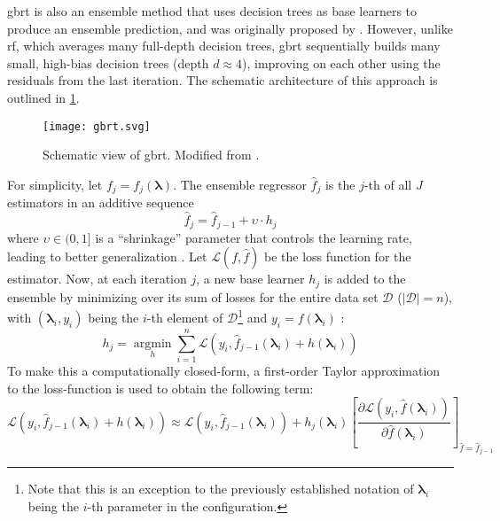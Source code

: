 \gls{gbrt} is also an ensemble method that uses decision trees as base learners to produce an ensemble prediction, and was originally proposed by \citet{friedman2001greedy}. However, unlike \gls{rf}, which averages many full-depth decision trees, \gls{gbrt} sequentially builds many small, high-bias decision trees (depth $d \approx 4$), improving on each other using the residuals from the last iteration. The schematic architecture of this approach is outlined in \cref{fig:gbrt}.
\begin{figure}
	\centering
	\texttt{[image: gbrt.svg]}
	\caption[Schematic view of \gls{gbrt}]{Schematic view of \gls{gbrt}. Modified from \citet{deng2021ensemble}.}
	\label{fig:gbrt}
\end{figure}
For simplicity, let $f_j = f_j(\mathbf{\lambda})$. The ensemble regressor $\hat{f}_j$ is the $j$-th of all $J$ estimators in an additive sequence 
\begin{equation}
	\label{eq:add-gbrt}
	\hat{f}_j = \hat{f}_{j-1} + \upsilon \cdot h_j
\end{equation}
where $\upsilon \in (0,1]$ is a \enquote{shrinkage} parameter that controls the learning rate, leading to better generalization \cite{friedman2002stochastic}.
Let $\mathcal{L}(f,\hat{f})$ be the loss function for the estimator. Now, at each iteration $j$, a new base learner $h_j$ is added to the ensemble by minimizing over its sum of losses for the entire data set $\mathcal{D}$ ($|\mathcal{D}| = n$), with $(\mathbf{\lambda}_i, y_i)$ being the $i$-th element of $\mathcal{D}$\footnote{Note that this is an exception to the previously established notation of $\mathbf{\lambda}_i$ being the $i$-th parameter in the configuration.} and $y_i = f(\mathbf{\lambda}_i)$ \cite{friedman2001greedy}:
\begin{equation}
	\label{eq:gbrt-tree}
	h_j = \operatorname*{argmin}_{h} \sum_{i=1}^{n} \mathcal{L}(y_i, \hat{f}_{j-1}(\mathbf{\lambda}_i) + h(\mathbf{\lambda}_i))
\end{equation}
To make this a computationally closed-form, a first-order Taylor approximation to the loss-function is used to obtain the following term:
\begin{equation}
	\mathcal{L}(y_i, \hat{f}_{j-1}(\mathbf{\lambda}_i) + h(\mathbf{\lambda}_i)) \approx \mathcal{L}(y_i, \hat{f}_{j-1}(\mathbf{\lambda}_i)) + h_j(\mathbf{\lambda}_i) \left[ \frac{\partial\mathcal{L}(y_i, \hat{f}(\mathbf{\lambda}_i))}{\partial \hat{f}(\mathbf{\lambda}_i)} \right]_{\hat{f}=\hat{f}_{j-1}}
\end{equation}
